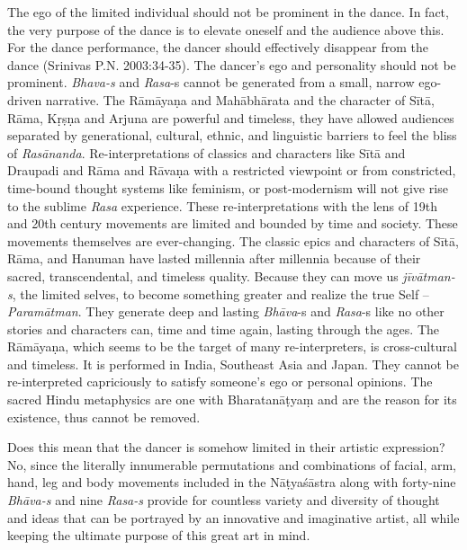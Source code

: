 The ego of the limited individual should not be prominent in the dance. In fact, the very purpose of the dance is to elevate oneself and the audience above this. For the dance performance, the dancer should effectively disappear from the dance (Srinivas P.N. 2003:34-35). The dancer’s ego and personality should not be prominent. \textit{Bhava-s} and \textit{Rasa}-s cannot be generated from a small, narrow ego-driven narrative. The Rāmāyaṇa and Mahābhārata and the character of Sītā, Rāma, Kṛṣṇa and Arjuna are powerful and timeless, they have allowed audiences separated by generational, cultural, ethnic, and linguistic barriers to feel the bliss of \textit{Rasānanda}. Re-interpretations of classics and characters like Sītā and Draupadi and Rāma and Rāvaṇa with a restricted viewpoint or from constricted, time-bound thought systems like feminism, or post-modernism will not give rise to the sublime \textit{Rasa} experience. These re-interpretations with the lens of 19th and 20th century movements are limited and bounded by time and society. These movements themselves are ever-changing. The classic epics and characters of Sītā, Rāma, and Hanuman have lasted millennia after millennia because of their sacred, transcendental, and timeless quality. Because they can move us \textit{jīvātman-s}, the limited selves, to become something greater and realize the true Self – \textit{Paramātman}. They generate deep and lasting \textit{Bhāva}-s and \textit{Rasa}-s like no other stories and characters can, time and time again, lasting through the ages. The Rāmāyaṇa, which seems to be the target of many re-interpreters, is cross-cultural and timeless. It is performed in India, Southeast Asia and Japan. They cannot be re-interpreted capriciously to satisfy someone’s ego or personal opinions. The sacred Hindu metaphysics are one with Bharatanāṭyaṃ and are the reason for its existence, thus cannot be removed.

\vskip -2pt

Does this mean that the dancer is somehow limited in their artistic expression? No, since the literally innumerable permutations and combinations of facial, arm, hand, leg and body movements included in the Nāṭyaśāstra along with forty-nine \textit{Bhāva-s} and nine \textit{Rasa-s} provide for countless variety and diversity of thought and ideas that can be portrayed by an innovative and imaginative artist, all while keeping the ultimate purpose of this great art in mind. 

